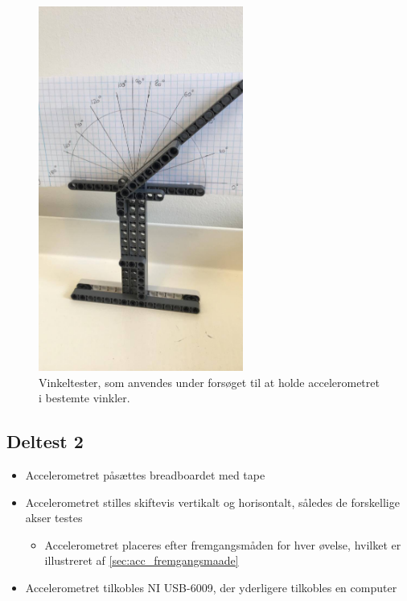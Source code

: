\begin{figure}[H]
\centering
\includegraphics[width=0.6\textwidth]{figures/vinkeltest}
\caption{Vinkeltester, som anvendes under forsøget til at holde accelerometret i bestemte vinkler.}
\label{fig:vinkeltest}
\end{figure}

\subsection{Deltest 2}
\begin{itemize}
\item Accelerometret påsættes breadboardet med tape
\item Accelerometret stilles skiftevis vertikalt og horisontalt, således de forskellige akser testes
\begin{itemize}
\item Accelerometret placeres efter fremgangsmåden for hver øvelse, hvilket er illustreret af \autoref{sec:acc_fremgangsmaade}
\end{itemize}
\item Accelerometret tilkobles NI USB-6009, der yderligere tilkobles en computer
\end{itemize}

